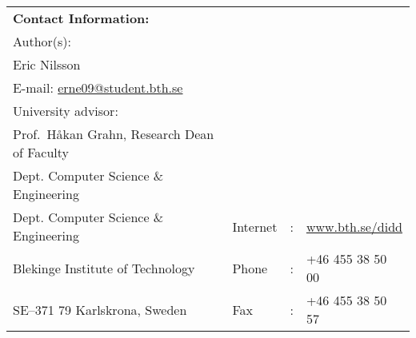 {\par\vspace{2cm}

\noindent%
\begin{tabular}{p{}lcl}
\textbf{Contact Information:}\\
Author(s):\\
Eric Nilsson\\
E-mail: \href{mailto:erne09@student.bth.se}{erne09@student.bth.se} \\ %
\par\vspace {5cm}
University advisor:\\
Prof.\ Håkan Grahn, Research Dean of Faculty\\
Dept. Computer Science \& Engineering

\par\vspace {1cm}

\noindent%
 \\
Dept. Computer Science \& Engineering & Internet & : & \href{http://www.bth.se/didd}{www.bth.se/didd}\\
Blekinge Institute of Technology & Phone	& : & +46 455 38 50 00 \\
SE--371 79 Karlskrona, Sweden & Fax & : & +46 455 38 50 57 \\
\end{tabular}
\clearpage
} %

\setcounter{page}{1}
